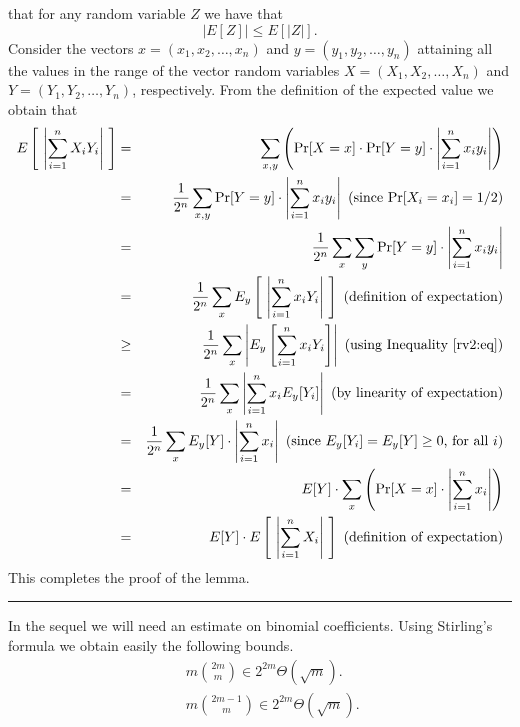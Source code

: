 \documentclass[12pt]{article}
\def\qed{\hfill\rule{2mm}{2mm}}
\begin{document}
that for any random variable $Z$ we have that 
\begin{equation}
\label{rv2:eq}
| E[Z]| \leq E[|Z|] .
\end{equation}
Consider the vectors $x = (x_1, x_2 ,\ldots ,x_n)$ and
$y = (y_1, y_2, \ldots , y_n)$ attaining all the values in the
range of the vector random variables
$X = (X_1, X_2 ,\ldots ,X_n)$ and
$Y = (Y_1, Y_2, \ldots , Y_n)$, respectively. 
From the definition of the expected
value we obtain that
\begin{eqnarray*}
E\left[ ~\left| \sum_{i=1}^n X_i Y_i \right| ~\right]
& = &
\sum_{x,y} \left(
\Pr [X=x] \cdot \Pr [Y=y] \cdot \left| \sum_{i=1}^n x_i y_i \right| 
\right)\\
& = &
\frac{1}{2^n} 
\sum_{x,y} \Pr [Y=y] \cdot \left| \sum_{i=1}^n x_i y_i \right| 
\mbox{ (since $\Pr [X_i = x_i ] = 1/2$)} \\
& = &
\frac{1}{2^n} 
\sum_x \sum_y \Pr [Y=y] \cdot \left| \sum_{i=1}^n x_i y_i \right| \\
& = &
\frac{1}{2^n} 
\sum_x E_y \left[ ~\left| \sum_{i=1}^n x_i Y_i \right| ~\right] 
\mbox{ (definition of expectation)} \\
& \geq &
\frac{1}{2^n} 
\sum_x \left| E_y \left[  \sum_{i=1}^n x_i Y_i  \right] \right| 
\mbox{ (using Inequality~\ref{rv2:eq})} \\
& = &
\frac{1}{2^n} 
\sum_x \left|   \sum_{i=1}^n x_i E_y [ Y_i]  \right| 
\mbox{ (by linearity of expectation)} \\
& = &
\frac{1}{2^n} 
\sum_x E_y [Y] \cdot \left|   \sum_{i=1}^n x_i   \right| 
\mbox{ (since $E_y [Y_i] = E_y [Y] \geq 0$, for all $i$)} \\
& = &
E[Y] \cdot  \sum_x \left( \Pr [X = x] \cdot \left|   \sum_{i=1}^n x_i   \right| \right)\\
& = &
E[Y] \cdot E\left[ ~\left| \sum_{i=1}^n X_i \right| ~\right] 
\mbox{ (definition of expectation)} \\
\end{eqnarray*}
This completes the proof of the lemma.
\qed

In the sequel we will need an estimate on binomial coefficients.
Using Stirling's formula we obtain easily the following bounds.
\begin{eqnarray}
\label{stirling:eq}
& ~ & m {{2m} \choose m} \in 2^{2m} \Theta (\sqrt{m}).\\
\label{stirling1:eq}
& ~ & m {{2m-1} \choose m} \in 2^{2m} \Theta (\sqrt{m}).
\end{eqnarray}
\end{document}
